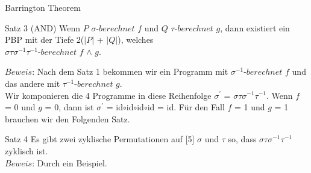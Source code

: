 \documentclass{beamer}
\begin{document}
\begin{frame}{Barrington Theorem}
\begin{block}{Satz 3 (AND)}
Wenn $P$ $\sigma$-$berechnet$ $f$ und $Q$ $\tau$-$berechnet$ $g$, dann existiert ein PBP mit der Tiefe 2($\mid$$P$$\mid$ + $\mid$$Q$$\mid$), welches \\[2pt]
$\sigma\tau\sigma^{-1}\tau^{-1}$-$berechnet$ $f$ $\wedge$ $g$.
\end{block}
$Beweis$: Nach dem Satz 1 bekommen wir ein Programm mit $\sigma^{-1}$-$berechnet$ $f$ und das andere mit $\tau^{-1}$-$berechnet$ $g$.\\[4pt]
Wir komponieren die 4 Programme in diese Reihenfolge $\sigma^{'}$ = $\sigma\tau\sigma^{-1}\tau^{-1}$. Wenn  $f$ = 0 und $g$ = 0, dann ist $\sigma^{'}$ = id$\circ$id$\circ$id$\circ$id = id. 
Für den Fall $f$ = 1 und $g$ = 1 brauchen wir den Folgenden Satz.\\[4pt]
\begin{block}{Satz 4}
Es gibt zwei zyklische Permutationen auf [5] $\sigma$ und $\tau$ so, dass
  $\sigma \tau \sigma^{-1} \tau^{-1}$ zyklisch ist.
\\[4pt]
$Beweis$: Durch ein Beispiel. 
\end{block}
\end{frame}
\end{document}
